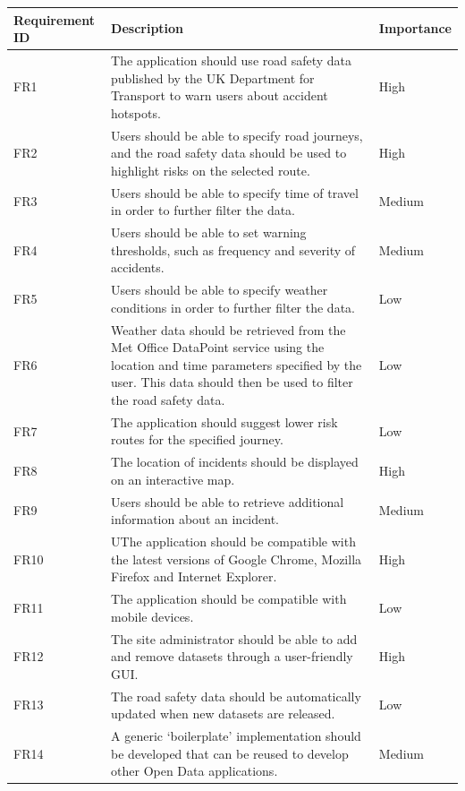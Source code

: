 \documentclass[authoryearcitations]{UoYCSproject}
\begin{document}
\begin{tabular}{| p{2.2cm} | p{7.5cm} | p{2cm} |}
	\hline
	\textbf{Requirement ID} & \textbf{Description} & \textbf{Importance} \\ \hline
	FR1 & The application should use road safety data published by the UK Department for Transport to warn users about accident hotspots. & High \\ \hline
	FR2 & Users should be able to specify road journeys, and the road safety data should be used to highlight risks on the selected route. & High \\ \hline
	FR3 & Users should be able to specify time of travel in order to further filter the data. & Medium \\ \hline
	FR4 & Users should be able to set warning thresholds, such as frequency and severity of accidents. & Medium \\ \hline
	FR5 & Users should be able to specify weather conditions in order to further filter the data. & Low \\ \hline
	FR6 & Weather data should be retrieved from the Met Office DataPoint service using the location and time parameters specified by the user. This data should then be used to filter the road safety data. & Low \\ \hline
	FR7 & The application should suggest lower risk routes for the specified journey. & Low \\ \hline
	FR8 & The location of incidents should be displayed on an interactive map. & High \\ \hline
	FR9 & Users should be able to retrieve additional information about an incident. & Medium \\ \hline
	FR10 & UThe application should be compatible with the latest versions of Google Chrome, Mozilla Firefox and Internet Explorer. & High \\ \hline
	FR11 & The application should be compatible with mobile devices. & Low \\ \hline
	FR12 & The site administrator should be able to add and remove datasets through a user-friendly GUI. & High \\ \hline
	FR13 & The road safety data should be automatically updated when new datasets are released. & Low \\ \hline
	FR14 & A generic ‘boilerplate’ implementation should be developed that can be reused to develop other Open Data applications. & Medium \\
	\hline
\end{tabular}
\end{document}
